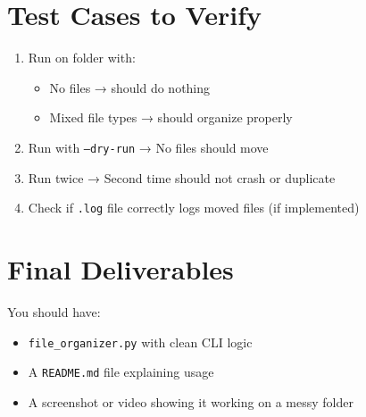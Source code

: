\documentclass[14pt]{extarticle}
\begin{document}
\section*{Test Cases to Verify}
\begin{enumerate}
    \item Run on folder with:
    \begin{itemize}
        \item No files → should do nothing
        \item Mixed file types → should organize properly
    \end{itemize}
    \item Run with \texttt{--dry-run} → No files should move
    \item Run twice → Second time should not crash or duplicate
    \item Check if \texttt{.log} file correctly logs moved files (if implemented)
\end{enumerate}

\section*{Final Deliverables}
You should have:
\begin{itemize}
    \item \texttt{file\_organizer.py} with clean CLI logic
    \item A \texttt{README.md} file explaining usage
    \item A screenshot or video showing it working on a messy folder
\end{itemize}
\end{document}
